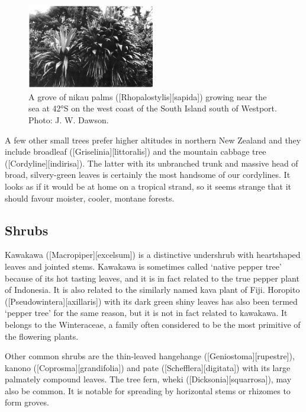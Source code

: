 \begin{figure}
	\includegraphics[width=0.5\textwidth]{graphics/figure61cabbagetree.jpg}
	\centering
	\caption[A grove of nikau palms]{A grove of nikau palms ([Rhopalostylis][sapida]) growing near the sea at 42°S on the west coast of the South Island south of Westport. Photo:  J. W. Dawson.}%
	\label{fig:61cabbagetree}
\end{figure}

A few other small trees prefer higher altitudes in northern New Zealand and they include broadleaf ([Griselinia][littoralis]) and the mountain cabbage tree ([Cordyline][indirisa]).
The latter with its unbranched trunk and massive head of broad, silvery-green leaves is certainly the most handsome of our cordylines.
It looks as if it would be at home on a tropical strand, so it seems strange that it should favour moister, cooler, montane forests.

\subsection{Shrubs}

Kawakawa ([Macropiper][excelsum]) is a distinctive undershrub with heartshaped leaves and jointed stems.
Kawakawa is sometimes called `native pepper tree' because of its hot tasting leaves, and it is in fact related to the true pepper plant of Indonesia.
It is also related to the similarly named kava plant of Fiji.
Horopito ([Pseudowintera][axillaris]) with its dark green shiny leaves has also been termed `pepper tree' for the same reason, but it is not in fact related to kawakawa.
It belongs to the Winteraceae, a family often considered to be the most primitive of the flowering plants.

Other common shrubs are the thin-leaved hangehange ([Geniostoma][rupestre]), kanono ([Coprosma][grandifolia]) and pate ([Schefflera][digitata]) with its large palmately compound leaves.
The tree fern, wheki ([Dicksonia][squarrosa]), may also be common.
It is notable for spreading by horizontal stems or rhizomes to form groves.

